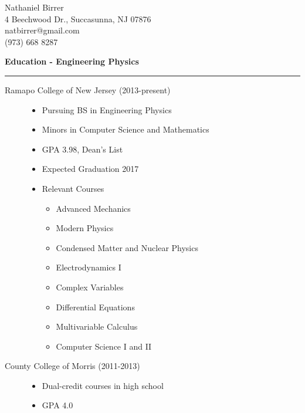 \documentclass[letterpaper,10pt]{article}
\begin{document}
 \begin{center}
  \Large
  Nathaniel Birrer \\
  \normalsize
  4 Beechwood Dr., Succasunna, NJ 07876 \\
  natbirrer@gmail.com \\
  (973) 668 8287 \\
 \end{center}
 
 \large
 \textbf{Education - Engineering Physics}
 \vspace{1 mm}
 \hrule
 \normalsize
 
 \begin{description}
 
   \item[Ramapo College of New Jersey (2013-present)] \hfill
   \begin{itemize}
    \item Pursuing BS in Engineering Physics
    \item Minors in Computer Science and Mathematics
    \item GPA 3.98, Dean's List
    \item Expected Graduation 2017
    \item Relevant Courses \hfill
     \begin{multicols}{2}
      \begin{itemize}
      \item Advanced Mechanics
      \item Modern Physics
      \item Condensed Matter and Nuclear Physics
      \item Electrodynamics I
      \item Complex Variables
      \item Differential Equations
      \item Multivariable Calculus
      \item Computer Science I and II
      \end{itemize}
     \end{multicols}
   \end{itemize}

   \item[County College of Morris (2011-2013)] \hfill
   \begin{itemize}
    \item Dual-credit courses in high school
    \item GPA 4.0
   \end{itemize}

 \end{description}
 
\end{document}
